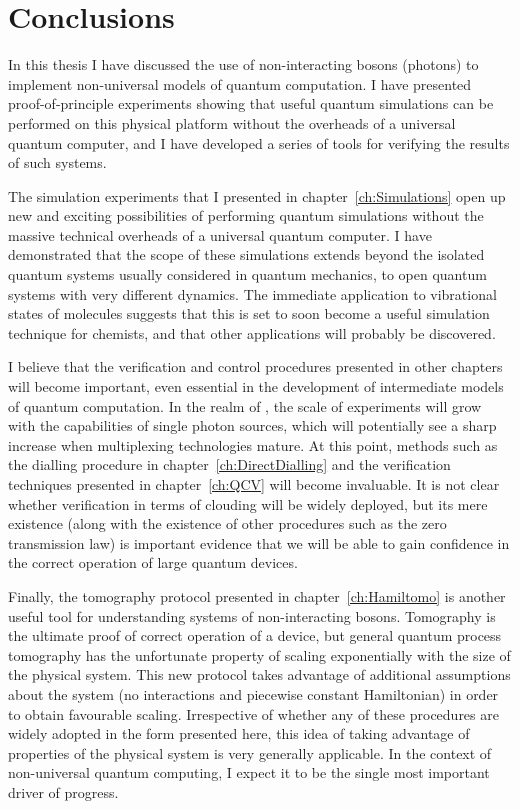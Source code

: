 \chapter{Conclusions}
\label{ch:Conclusions}
In this thesis I have discussed the use of non-interacting bosons (photons) to
implement non-universal models of quantum computation. I have presented
proof-of-principle experiments showing that useful quantum simulations can be
performed on this physical platform without the overheads of a universal quantum
computer, and I have developed a series of tools for verifying the results of
such systems.

The simulation experiments that I presented in chapter~\ref{ch:Simulations} open
up new and exciting possibilities of performing quantum simulations without the
massive technical overheads of a universal quantum computer. I have demonstrated
that the scope of these simulations extends beyond the isolated quantum systems
usually considered in quantum mechanics, to open quantum systems with very
different dynamics. The immediate application to vibrational states of molecules
suggests that this is set to soon become a useful simulation technique for
chemists, and that other applications will probably be discovered.

I believe that the verification and control procedures presented in other
chapters will become important, even essential in the development of
intermediate models of quantum computation. In the realm of \bosonsampling{},
the scale of experiments will grow with the capabilities of single photon
sources, which will potentially see a sharp increase when multiplexing
technologies mature. At this point, methods such as the dialling procedure in
chapter~\ref{ch:DirectDialling} and the verification techniques presented in
chapter~\ref{ch:QCV} will become invaluable. It is not clear whether
verification in terms of clouding will be widely deployed, but its mere
existence (along with the existence of other procedures such as the zero
transmission law) is important evidence that we will be able to gain confidence
in the correct operation of large quantum devices. 

Finally, the tomography protocol presented in chapter~\ref{ch:Hamiltomo} is
another useful tool for understanding systems of non-interacting bosons.
Tomography is the ultimate proof of correct operation of a device, but general
quantum process tomography has the unfortunate property of scaling exponentially
with the size of the physical system. This new protocol takes advantage of
additional assumptions about the system (no interactions and piecewise constant
Hamiltonian) in order to obtain favourable scaling. Irrespective of whether any
of these procedures are widely adopted in the form presented here, this idea of
taking advantage of properties of the physical system is very generally
applicable. In the context of non-universal quantum computing, I expect it to be
the single most important driver of progress.

